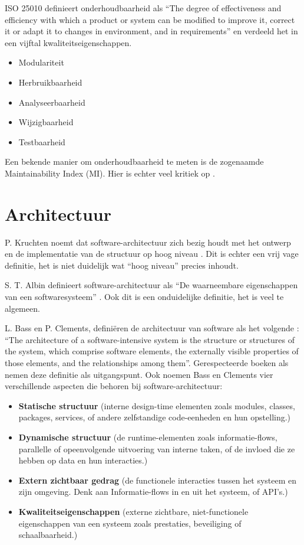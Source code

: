 ISO 25010 \parencite{ISO25010} definieert onderhoudbaarheid als \enquote{The degree of effectiveness and efficiency with which a product or system can be modified to improve it, correct it or adapt it to changes in environment, and in requirements} en verdeeld het in een vijftal kwaliteitseigenschappen.
\begin{itemize}
	\item Modulariteit
	\item Herbruikbaarheid
	\item Analyseerbaarheid
	\item Wijzigbaarheid
	\item Testbaarheid
\end{itemize}

Een bekende manier om onderhoudbaarheid te meten is de zogenaamde Maintainability Index (MI). Hier is echter veel kritiek op \parencite{MaintainabilityLiteratureReview, WhyNoMI, WhyNoMI2}.

\section{Architectuur}
P. Kruchten noemt dat software-architectuur zich bezig houdt met het ontwerp en de implementatie van de structuur op hoog niveau \parencite{4plus1}. Dit is echter een vrij vage definitie, het is niet duidelijk wat \enquote{hoog niveau} precies inhoudt.

S. T. Albin definieert software-architectuur als \enquote{De waarneembare eigenschappen van een softwaresysteem} \parencite{ArtOfArchitecture}. Ook dit is een onduidelijke definitie, het is veel te algemeen.

L. Bass en P. Clements, definiëren de architectuur van software als het volgende \parencite{ArchitectureInPractice}: \enquote{The architecture of a software-intensive system is the structure or structures of the system, which comprise software elements, the externally visible properties of those elements, and the relationships among them}. Gerespecteerde boeken als \parencite{ArchitectureStakeholders, DesigningArchitectures} nemen deze definitie als uitgangspunt. Ook noemen Bass en Clements vier verschillende aspecten die behoren bij software-architectuur:
\begin{itemize}
	\item \textbf{Statische structuur} (interne design-time elementen zoals modules, classes, packages, services, of andere zelfstandige code-eenheden en hun opstelling.)
	\item \textbf{Dynamische structuur} (de runtime-elementen zoals informatie-flows, parallelle of opeenvolgende uitvoering van interne taken, of de invloed die ze hebben op data en hun interacties.)
	\item \textbf{Extern zichtbaar gedrag} (de functionele interacties tussen het systeem en zijn omgeving. Denk aan Informatie-flows in en uit het systeem, of API's.)
	\item \textbf{Kwaliteitseigenschappen} (externe zichtbare, niet-functionele eigenschappen van een systeem zoals prestaties, beveiliging of schaalbaarheid.)
\end{itemize}

